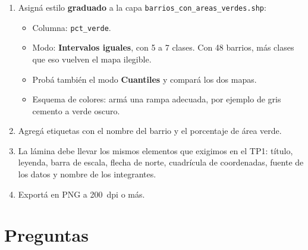 \documentclass{article}
\begin{document}
\begin{enumerate}
    \item Asigná estilo \textbf{graduado} a la capa \texttt{barrios\_con\_areas\_verdes.shp}:
    \begin{itemize}
        \item Columna: \texttt{pct\_verde}.
        \item Modo: \textbf{Intervalos iguales}, con 5 a 7 clases. Con 48 barrios, más clases que eso vuelven el mapa ilegible.
        \item Probá también el modo \textbf{Cuantiles} y compará los dos mapas.
        \item Esquema de colores: armá una rampa adecuada, por ejemplo de gris cemento a verde oscuro.
    \end{itemize}
    \item Agregá etiquetas con el nombre del barrio y el porcentaje de área verde.
    \item La lámina debe llevar los mismos elementos que exigimos en el TP1: título, leyenda, barra de escala, flecha de norte, cuadrícula de coordenadas, fuente de los datos y nombre de los integrantes.
    \item Exportá en PNG a 200~dpi o más.
\end{enumerate}

\section{Preguntas}
\end{document}
